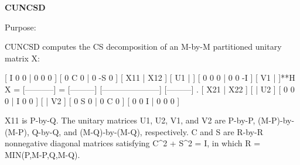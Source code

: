 {\bfseries C\+U\+N\+C\+S\+D} 

 \begin{DoxyParagraph}{Purpose\+: }
\begin{DoxyVerb} CUNCSD computes the CS decomposition of an M-by-M partitioned
 unitary matrix X:

                                 [  I  0  0 |  0  0  0 ]
                                 [  0  C  0 |  0 -S  0 ]
     [ X11 | X12 ]   [ U1 |    ] [  0  0  0 |  0  0 -I ] [ V1 |    ]**H
 X = [-----------] = [---------] [---------------------] [---------]   .
     [ X21 | X22 ]   [    | U2 ] [  0  0  0 |  I  0  0 ] [    | V2 ]
                                 [  0  S  0 |  0  C  0 ]
                                 [  0  0  I |  0  0  0 ]

 X11 is P-by-Q. The unitary matrices U1, U2, V1, and V2 are P-by-P,
 (M-P)-by-(M-P), Q-by-Q, and (M-Q)-by-(M-Q), respectively. C and S are
 R-by-R nonnegative diagonal matrices satisfying C^2 + S^2 = I, in
 which R = MIN(P,M-P,Q,M-Q).\end{DoxyVerb}
 
\end{DoxyParagraph}

